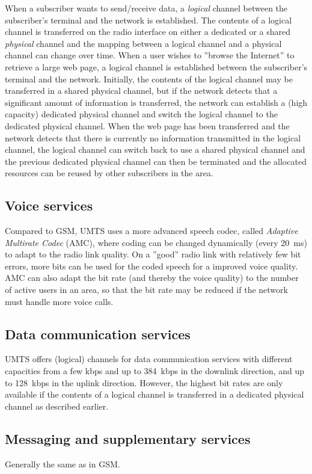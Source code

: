 When a subscriber wants to send/receive data, a \emph{logical} channel between the subscriber's terminal and the network is established. The contents of a logical channel is transferred on the radio interface on either a dedicated or a shared \emph{physical} channel and the mapping between a logical channel and a physical channel can change over time. When a user wishes to ''browse the Internet'' to retrieve a large web page, a logical channel is established between the subscriber's terminal and the network. Initially, the contents of the logical channel may be transferred in a shared physical channel, but if the network detects that a significant amount of information is transferred, the network can establish a (high capacity) dedicated physical channel and switch the logical channel to the dedicated physical channel. When the web page has been transferred and the network detects that there is currently no information transmitted in the logical channel, the logical channel can switch back to use a shared physical channel and the previous dedicated physical channel can then be terminated and the allocated resources can be reused by other subscribers in the area.

\subsection{Voice services}
Compared to GSM, UMTS uses a more advanced speech codec, called \emph{Adaptive Multirate Codec} (AMC), where coding can be changed dynamically (every 20~ms) to adapt to the radio link quality. On a ''good'' radio link with relatively few bit errors, more bits can be used for the coded speech for a improved voice quality. AMC can also adapt the bit rate (and thereby the voice quality) to the number of active users in an area, so that the bit rate may be reduced if the network must handle more voice calls.


\subsection{Data communication services}
UMTS offers (logical) channels for data communication services with different capacities from a few kbps and up to 384~kbps in the downlink direction, and up to 128~kbps in the uplink direction. However, the highest bit rates are only available if the contents of a logical channel is transferred in a dedicated physical channel as described earlier.

\subsection{Messaging and supplementary services}
Generally the same as in GSM.

